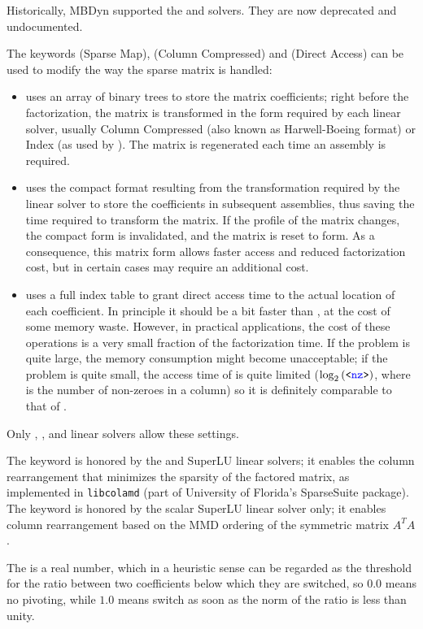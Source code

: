Historically, MBDyn supported the  and  solvers.
They are now deprecated and undocumented.


The keywords  (Sparse Map),  (Column Compressed)
and  (Direct Access) can be used to modify the way
the sparse matrix is handled:
\begin{itemize}
\item {} uses an array of binary trees to store the matrix
coefficients; right before the factorization, the matrix is transformed
in the form required by each linear solver, usually Column Compressed
(also known as Harwell-Boeing format) or Index (as used by ).
The matrix is regenerated each time an assembly is required.
\item {} uses the compact format resulting from the transformation
required by the linear solver to store the coefficients in subsequent assemblies,
thus saving the time required to transform the matrix.
If the profile of the matrix changes, the compact form is invalidated,
and the matrix is reset to  form.  As a consequence, this matrix
form allows faster access and reduced factorization cost, but in certain
cases may require an additional cost.
\item {} uses a full index table to grant direct access time to
the actual location of each coefficient.
In principle it should be a bit faster than , at the cost
of some memory waste.
However, in practical applications, the cost of these operations
is a very small fraction of the factorization time.
If the problem is quite large, the memory consumption might
become unacceptable; if the problem is quite small, the access time
of  is quite limited ($\log_2\left( \texttt{<\textcolor{blue}{nz}>} \right)$, where
 is the number of non-zeroes in a column) so it is definitely
comparable to that of .
\end{itemize}
Only , ,  and 
linear solvers allow these settings.

The keyword  is honored by the  and SuperLU linear solvers;
it enables the column rearrangement that minimizes the sparsity
of the factored matrix, as implemented in \texttt{libcolamd}
(part of University of Florida's SparseSuite package).
The keyword  is honored by 
the scalar SuperLU linear solver only; it enables column rearrangement
based on the MMD ordering of the symmetric matrix $A^T A$.


The  is a real number, which in a heuristic sense 
can be regarded as the threshold for the ratio between two coefficients 
below which they are switched, so $ 0.0 $ means no pivoting, 
while $ 1.0 $ means switch as soon as the norm of the ratio 
is less than unity.

